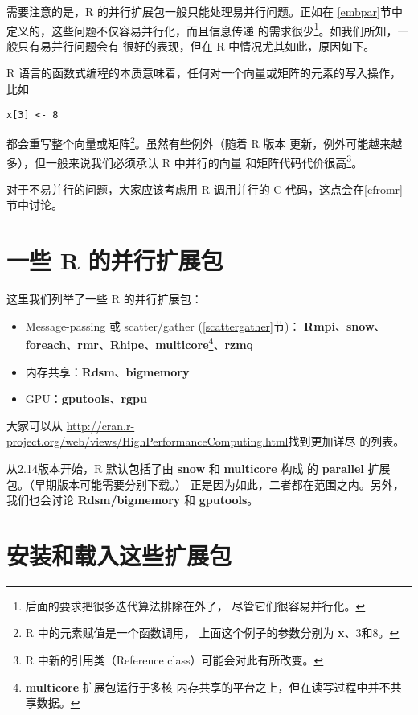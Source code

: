 需要注意的是，R 的并行扩展包一般只能处理易并行问题。正如在
\ref{embpar}节中定义的，这些问题不仅容易并行化，而且信息传递
的需求很少\footnote{后面的要求把很多迭代算法排除在外了，
尽管它们很容易并行化。}。如我们所知，一般只有易并行问题会有
很好的表现，但在 R 中情况尤其如此，原因如下。

R 语言的函数式编程的本质意味着，任何对一个向量或矩阵的元素的写入操作，
比如
\begin{lstlisting}
x[3] <- 8
\end{lstlisting}
都会重写整个向量或矩阵\footnote{R 中的元素赋值是一个函数调用，
上面这个例子的参数分别为 {\bf x}、3和8。}。虽然有些例外（随着 R 版本
更新，例外可能越来越多），但一般来说我们必须承认 R 中并行的向量
和矩阵代码代价很高\footnote{R 中新的引用类（Reference class）可能会对此有所改变。}。

对于不易并行的问题，大家应该考虑用 R 调用并行的 C 代码，这点会在\ref{cfromr}
节中讨论。

\section{一些 R 的并行扩展包}

这里我们列举了一些 R 的并行扩展包：

\begin{itemize}

\item Message-passing 或 scatter/gather (\ref{scattergather}节)：
{\bf Rmpi}、{\bf snow}、{\bf foreach}、{\bf rmr}、{\bf Rhipe}、{\bf multicore}\footnote{{\bf multicore} 扩展包运行于多核
内存共享的平台之上，但在读写过程中并不共享数据。}、{\bf rzmq}

\item 内存共享：{\bf Rdsm}、{\bf bigmemory}

\item GPU：{\bf gputools}、{\bf rgpu}

\end{itemize}

大家可以从
\url{http://cran.r-project.org/web/views/HighPerformanceComputing.html}找到更加详尽
的列表。

从2.14版本开始，R 默认包括了由 {\bf snow} 和 {\bf multicore} 构成
的 {\bf parallel} 扩展包。（早期版本可能需要分别下载。）
正是因为如此，二者都在范围之内。另外，我们也会讨论
{\bf Rdsm/bigmemory} 和 {\bf gputools}。

\section{安装和载入这些扩展包}


